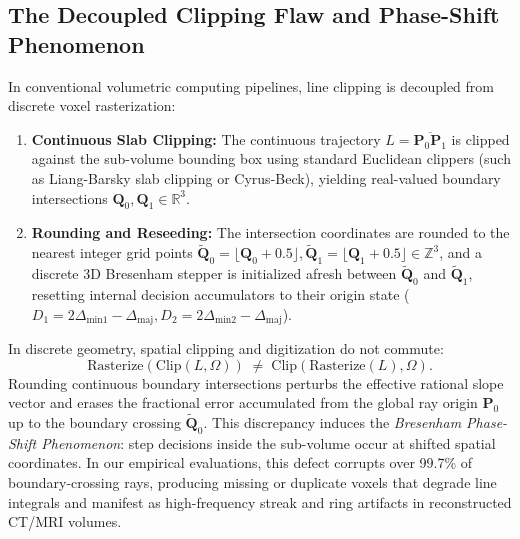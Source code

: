 \documentclass[11pt]{article}
\begin{document}
\subsection*{The Decoupled Clipping Flaw and Phase-Shift Phenomenon}
In conventional volumetric computing pipelines, line clipping is decoupled from discrete voxel rasterization:
\begin{enumerate}
    \item \textbf{Continuous Slab Clipping:} The continuous trajectory $L = \overline{\mathbf{P}_0 \mathbf{P}_1}$ is clipped against the sub-volume bounding box using standard Euclidean clippers (such as Liang-Barsky slab clipping\cite{liang1984new} or Cyrus-Beck\cite{cyrus1978generalized}), yielding real-valued boundary intersections $\mathbf{Q}_0, \mathbf{Q}_1 \in \mathbb{R}^3$.
    \item \textbf{Rounding and Reseeding:} The intersection coordinates are rounded to the nearest integer grid points $\tilde{\mathbf{Q}}_0 = \lfloor \mathbf{Q}_0 + 0.5 \rfloor, \tilde{\mathbf{Q}}_1 = \lfloor \mathbf{Q}_1 + 0.5 \rfloor \in \mathbb{Z}^3$, and a discrete 3D Bresenham stepper\cite{bresenham1965algorithm} is initialized afresh between $\tilde{\mathbf{Q}}_0$ and $\tilde{\mathbf{Q}}_1$, resetting internal decision accumulators to their origin state ($D_1 = 2\Delta_{\mathrm{min1}} - \Delta_{\mathrm{maj}}, D_2 = 2\Delta_{\mathrm{min2}} - \Delta_{\mathrm{maj}}$).
\end{enumerate}

In discrete geometry,\cite{reveilles1991geometrie,coeurjolly2004discrete} spatial clipping and digitization do not commute:
\begin{equation}
    \label{eq:non_commutativity}
    \mathrm{Rasterize}(\mathrm{Clip}(L, \Omega)) \;\ne\; \mathrm{Clip}(\mathrm{Rasterize}(L), \Omega).
\end{equation}
Rounding continuous boundary intersections perturbs the effective rational slope vector and erases the fractional error accumulated from the global ray origin $\mathbf{P}_0$ up to the boundary crossing $\tilde{\mathbf{Q}}_0$. This discrepancy induces the \emph{Bresenham Phase-Shift Phenomenon}: step decisions inside the sub-volume occur at shifted spatial coordinates. In our empirical evaluations, this defect corrupts over 99.7\% of boundary-crossing rays, producing missing or duplicate voxels that degrade line integrals and manifest as high-frequency streak and ring artifacts in reconstructed CT/MRI volumes.

\end{document}
